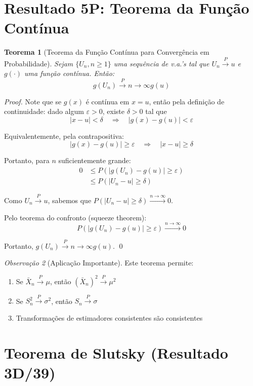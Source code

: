 \documentclass[12pt,a4paper]{article}
\theoremstyle{plain}
\newtheorem{teorema}{Teorema}[section]
\theoremstyle{definition}
\theoremstyle{remark}
\newtheorem{observacao}[teorema]{Observação}
\begin{document}
\section{Resultado 5P: Teorema da Função Contínua}

\begin{teorema}[Teorema da Função Contínua para Convergência em Probabilidade]
Sejam $\{U_n, n \geq 1\}$ uma sequência de v.a.'s tal que $U_n \xrightarrow{P} u$ e $g(\cdot)$ uma função contínua. Então:
\[
g(U_n) \xrightarrow{P}{n \to \infty} g(u)
\]
\end{teorema}

\begin{proof}
Note que se $g(x)$ é contínua em $x = u$, então pela definição de continuidade: dado algum $\varepsilon > 0$, existe $\delta > 0$ tal que
\[
|x - u| < \delta \quad \Rightarrow \quad |g(x) - g(u)| < \varepsilon
\]

Equivalentemente, pela contrapositiva:
\[
|g(x) - g(u)| \geq \varepsilon \quad \Rightarrow \quad |x - u| \geq \delta
\]

Portanto, para $n$ suficientemente grande:
\begin{align}
0 &\leq P\left( |g(U_n) - g(u)| \geq \varepsilon \right) \\
&\leq P\left( |U_n - u| \geq \delta \right)
\end{align}

Como $U_n \xrightarrow{P} u$, sabemos que $P\left( |U_n - u| \geq \delta \right) \xrightarrow{n \to \infty} 0$.

Pelo teorema do confronto (squeeze theorem):
\[
P\left( |g(U_n) - g(u)| \geq \varepsilon \right) \xrightarrow{n \to \infty} 0
\]

Portanto, $g(U_n) \xrightarrow{P}{n \to \infty} g(u)$. \qed
\end{proof}

\begin{observacao}[Aplicação Importante]
Este teorema permite:
\begin{enumerate}
    \item Se $\bar{X}_n \xrightarrow{P} \mu$, então $(\bar{X}_n)^2 \xrightarrow{P} \mu^2$
    \item Se $S_n^2 \xrightarrow{P} \sigma^2$, então $S_n \xrightarrow{P} \sigma$
    \item Transformações de estimadores consistentes são consistentes
\end{enumerate}
\end{observacao}

\section{Teorema de Slutsky (Resultado 3D/39)}
\end{document}
